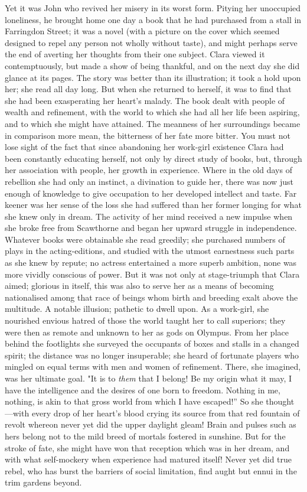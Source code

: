 Yet it was John who revived her misery in its worst form. Pitying her
unoccupied loneliness, he brought home one day a book that he had
purchased from a stall in Farringdon Street; it was a novel (with a
picture on the cover which seemed designed to repel any person not
wholly without taste), and might perhaps serve the end of averting her
thoughts {}from their one subject. Clara viewed it contemptuously, but
made a show of being thankful, and on the next day she did glance at its
pages. The story was better than its illustration; it took a hold upon
her; she read all day long. But when she returned to herself, it was to
find that she had been exasperating her heart's malady. The book dealt
with people of wealth and refinement, with the world to which she had
all her life been aspiring, and to which she might have attained. The
meanness of her surroundings became in comparison more mean, the
bitterness of her fate more bitter. You must not lose sight of the fact
that since abandoning her work-girl existence Clara had been constantly
educating herself, not only by direct study of books, but, through her
association with people, her growth in experience. Where in the old days
of rebellion she had only an instinct, a divination to guide her, there
was now just enough of knowledge to give occupation to her developed
intellect and taste. Far keener was her sense of the loss she had
suffered than her former longing for what she knew only in dream. The
activity of her mind received a new {}impulse when she broke free from
Scawthorne and began her upward struggle in independence. Whatever books
were obtainable she read greedily; she purchased numbers of plays in the
acting-editions, and studied with the utmost earnestness such parts as
she knew by repute; no actress entertained a more superb ambition, none
was more vividly conscious of power. But it was not only at
stage-triumph that Clara aimed; glorious in itself, this was also to
serve her as a means of becoming nationalised among that race of beings
whom birth and breeding exalt above the multitude. A notable illusion;
pathetic to dwell upon. As a work-girl, she nourished envious hatred of
those the world taught her to call superiors; they were then as remote
and unknown to her as gods on Olympus. From her place behind the
footlights she surveyed the occupants of boxes and stalls in a changed
spirit; the distance was no longer insuperable; she heard of fortunate
players who mingled on equal terms with men and women of refinement.
There, she imagined, was her ultimate goal. "It is to \emph{them} that I
belong! Be my origin what it may, I have the intelligence and the
desires {}of one born to freedom. Nothing in me, nothing, is akin to
that gross world from which I have escaped!'' So she thought---with
every drop of her heart's blood crying its source from that red fountain
of revolt whereon never yet did the upper daylight gleam! Brain and
pulses such as hers belong not to the mild breed of mortals fostered in
sunshine. But for the stroke of fate, she might have won that reception
which was in her dream, and with what self-mockery when experience had
matured itself! Never yet did true rebel, who has burst the barriers of
social limitation, find aught but ennui in the trim gardens beyond.

